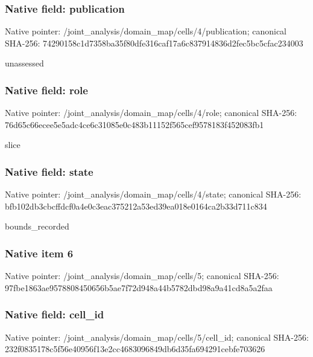 \documentclass[10pt,a4paper]{article}
\begin{document}
\subsubsection{Native field: publication}
Native pointer: /joint\_\allowbreak{}analysis/domain\_\allowbreak{}map/cells/4/publication; canonical SHA-256: 74290158c1d7358ba35f80dfe316caf17a6c837914836d2fec5bc5cfac234003

\begingroup\raggedright\sloppy unassessed\par\endgroup

\subsubsection{Native field: role}
Native pointer: /joint\_\allowbreak{}analysis/domain\_\allowbreak{}map/cells/4/role; canonical SHA-256: 76d65c66ecee5e5adc4ce6c31085e0c483b11152f565cef9578183f452083fb1

\begingroup\raggedright\sloppy slice\par\endgroup

\subsubsection{Native field: state}
Native pointer: /joint\_\allowbreak{}analysis/domain\_\allowbreak{}map/cells/4/state; canonical SHA-256: bfb102db3cbcffdcf0a4e0c3eac375212a53ed39ea018e0164ca2b33d711c834

\begingroup\raggedright\sloppy bounds\_\allowbreak{}recorded\par\endgroup

\subsubsection{Native item 6}
Native pointer: /joint\_\allowbreak{}analysis/domain\_\allowbreak{}map/cells/5; canonical SHA-256: 97fbe1863ae9578808450656b5ae7f72d948a44b5782dbd98a9a41cd8a5a2faa

\subsubsection{Native field: cell\_\allowbreak{}id}
Native pointer: /joint\_\allowbreak{}analysis/domain\_\allowbreak{}map/cells/5/cell\_\allowbreak{}id; canonical SHA-256: 232f0835178c5f56e40956f13e2cc4683096849db6d35fa694291cebfe703626
\end{document}

